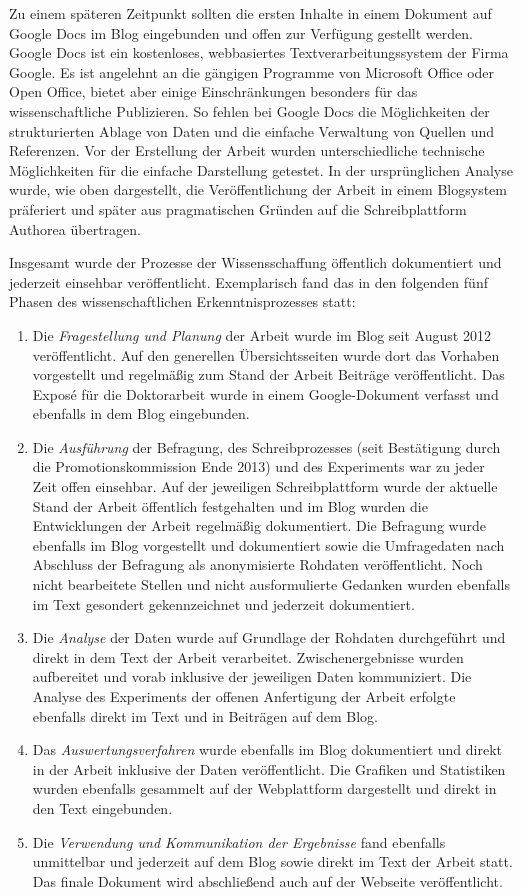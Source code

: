 Zu einem späteren Zeitpunkt sollten die ersten Inhalte in einem Dokument auf Google Docs im Blog eingebunden und offen zur Verfügung gestellt werden. Google Docs ist ein kostenloses, webbasiertes Textverarbeitungssystem der Firma Google. Es ist angelehnt an die gängigen Programme von Microsoft Office oder Open Office, bietet aber einige Einschränkungen besonders für das wissenschaftliche Publizieren. So fehlen bei Google Docs die Möglichkeiten der strukturierten Ablage von Daten und die einfache Verwaltung von Quellen und Referenzen. Vor der Erstellung der Arbeit wurden unterschiedliche technische Möglichkeiten für die einfache Darstellung getestet. In der ursprünglichen Analyse wurde, wie oben dargestellt, die Veröffentlichung der Arbeit in einem Blogsystem präferiert und später aus pragmatischen Gründen auf die Schreibplattform Authorea übertragen.

Insgesamt wurde der Prozesse der Wissensschaffung öffentlich dokumentiert und jederzeit einsehbar veröffentlicht. Exemplarisch fand das in den folgenden fünf Phasen des wissenschaftlichen Erkenntnisprozesses statt:
\begin{enumerate}
\item Die \textit{Fragestellung und Planung} der Arbeit wurde im Blog seit August 2012 veröffentlicht. Auf den generellen Übersichtsseiten wurde dort das Vorhaben vorgestellt und regelmäßig zum Stand der Arbeit Beiträge veröffentlicht. Das Exposé für die Doktorarbeit wurde in einem Google-Dokument verfasst und ebenfalls in dem Blog eingebunden.
\item Die \textit{Ausführung} der Befragung, des Schreibprozesses (seit Bestätigung durch die Promotionskommission Ende 2013) und des Experiments war zu jeder Zeit offen einsehbar. Auf der jeweiligen Schreibplattform wurde der aktuelle Stand der Arbeit öffentlich festgehalten und im Blog wurden die Entwicklungen der Arbeit regelmäßig dokumentiert. Die Befragung wurde ebenfalls im Blog vorgestellt und dokumentiert sowie die Umfragedaten nach Abschluss der Befragung als anonymisierte Rohdaten veröffentlicht. Noch nicht bearbeitete Stellen und nicht ausformulierte Gedanken wurden ebenfalls im Text gesondert gekennzeichnet und jederzeit dokumentiert.
\item Die \textit{Analyse} der Daten wurde auf Grundlage der Rohdaten durchgeführt und direkt in dem Text der Arbeit verarbeitet. Zwischenergebnisse wurden aufbereitet und vorab inklusive der jeweiligen Daten kommuniziert. Die Analyse des Experiments der offenen Anfertigung der Arbeit erfolgte ebenfalls direkt im Text und in Beiträgen auf dem Blog.
\item Das \textit{Auswertungsverfahren} wurde ebenfalls im Blog dokumentiert und direkt in der Arbeit inklusive der Daten veröffentlicht. Die Grafiken und Statistiken wurden ebenfalls gesammelt auf der Webplattform dargestellt und direkt in den Text eingebunden.
\item Die \textit{Verwendung und Kommunikation der Ergebnisse} fand ebenfalls unmittelbar und jederzeit auf dem Blog sowie direkt im Text der Arbeit statt. Das finale Dokument wird abschließend auch auf der Webseite veröffentlicht.
\end{enumerate}

